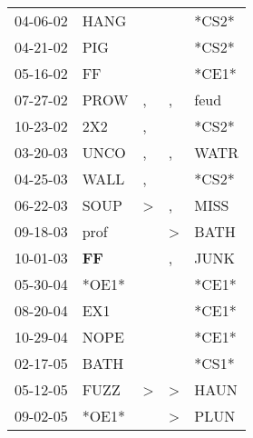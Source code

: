 \begin{supertabular}{p{0.07\textwidth}p{0.06\textwidth}p{0.02\textwidth}p{0.02\textwidth}p{0.06\textwidth}}
 04-06-02\textsuperscript{} &           HANG\textsuperscript{} &               &               &                   *CS2* \\
 04-21-02\textsuperscript{} &            PIG\textsuperscript{} &               &               &                   *CS2* \\
 05-16-02\textsuperscript{} &             FF\textsuperscript{} &               &               &                   *CE1* \\
 07-27-02\textsuperscript{} &           PROW\textsuperscript{} &             , &             , &  feud\textsuperscript{} \\
 10-23-02\textsuperscript{} &            2X2\textsuperscript{} &             , &               &                   *CS2* \\
 03-20-03\textsuperscript{} &           UNCO\textsuperscript{} &             , &             , &  WATR\textsuperscript{} \\
 04-25-03\textsuperscript{} &           WALL\textsuperscript{} &             , &               &                   *CS2* \\
 06-22-03\textsuperscript{} &           SOUP\textsuperscript{} &  \textgreater &             , &  MISS\textsuperscript{} \\
 09-18-03\textsuperscript{} &           prof\textsuperscript{} &               &  \textgreater &  BATH\textsuperscript{} \\
 10-01-03\textsuperscript{} &    \textbf{FF\textsuperscript{}} &               &             , &  JUNK\textsuperscript{} \\
 05-30-04\textsuperscript{} &                            *OE1* &               &               &                   *CE1* \\
 08-20-04\textsuperscript{} &            EX1\textsuperscript{} &               &               &                   *CE1* \\
 10-29-04\textsuperscript{} &           NOPE\textsuperscript{} &               &               &                   *CE1* \\
 02-17-05\textsuperscript{} &           BATH\textsuperscript{} &               &               &                   *CS1* \\
 05-12-05\textsuperscript{} &           FUZZ\textsuperscript{} &  \textgreater &  \textgreater &  HAUN\textsuperscript{} \\
 09-02-05\textsuperscript{} &                            *OE1* &               &  \textgreater &  PLUN\textsuperscript{} \\

\end{supertabular}
